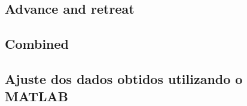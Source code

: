 \documentclass[portuguese,11pt,a4paper,titlepage]{article}
\newcommand{\srcdir}{..}
\newcommand{\matlabdir}{"../MATLAB-fittings"}
\begin{document}
\subsection{Advance and retreat}

\pagebreak
\subsection{Combined}

\pagebreak
\subsection{Ajuste dos dados obtidos utilizando o MATLAB}

\end{document}
